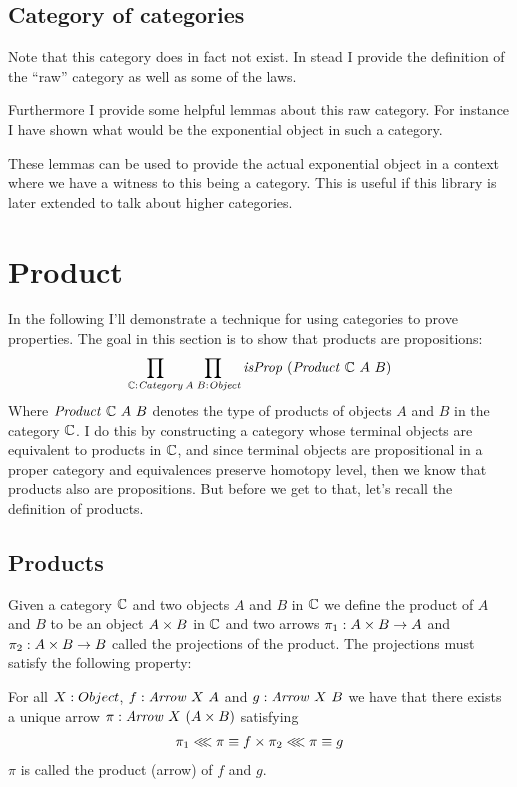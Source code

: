 \subsection{Category of categories}
Note that this category does in fact not exist. In stead I provide the
definition of the ``raw'' category as well as some of the laws.

Furthermore I provide some helpful lemmas about this raw category. For instance
I have shown what would be the exponential object in such a category.

These lemmas can be used to provide the actual exponential object in a context
where we have a witness to this being a category. This is useful if this library
is later extended to talk about higher categories.

\section{Product}
In the following I'll demonstrate a technique for using categories to prove
properties. The goal in this section is to show that products are propositions:
%
$$
\prod_{\mathbb{C} \mathrel{:} \mathit{Category}} \prod_{A\;B \mathrel{:} \mathit{Object}} \mathit{isProp}\ (\mathit{Product}\ \mathbb{C}\ A\ B)
$$
%
Where $\mathit{Product}\ \mathbb{C}\ A\ B$ denotes the type of products of objects $A$
and $B$ in the category $\mathbb{C}$. I do this by constructing a category whose
terminal objects are equivalent to products in $\mathbb{C}$, and since terminal objects
are propositional in a proper category and equivalences preserve homotopy level,
then we know that products also are propositions. But before we get to that,
let's recall the definition of products.

\subsection{Products}
Given a category $\mathbb{C}$ and two objects $A$ and $B$ in $\mathbb{C}$ we define the
product of $A$ and $B$ to be an object $A \times B$ in $\mathbb{C}$ and two arrows $\pi_1
\mathrel{:} A \times B \to A$ and $\pi_2 \mathrel{:} A \times B \to B$ called the projections of the
product. The projections must satisfy the following property:

For all $X \mathrel{:} Object$, $f \mathrel{:} \mathit{Arrow}\ X\ A$ and $g \mathrel{:} \mathit{Arrow}\ X\ B$ we have
that there exists a unique arrow $\pi \mathrel{:} \mathit{Arrow}\ X\ (A \times B)$ satisfying
%
\begin{align}
\label{eq:umpProduct}
\pi_1 \lll \pi \equiv f \times \pi_2 \lll \pi \equiv g
\end{align}
%
$\pi$ is called the product (arrow) of $f$ and $g$.

